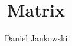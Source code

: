 \documentclass[preview]{standalone}
\title{Matrix}
\author{Daniel Jankowski}
\begin{document}
$

$
\end{document}
